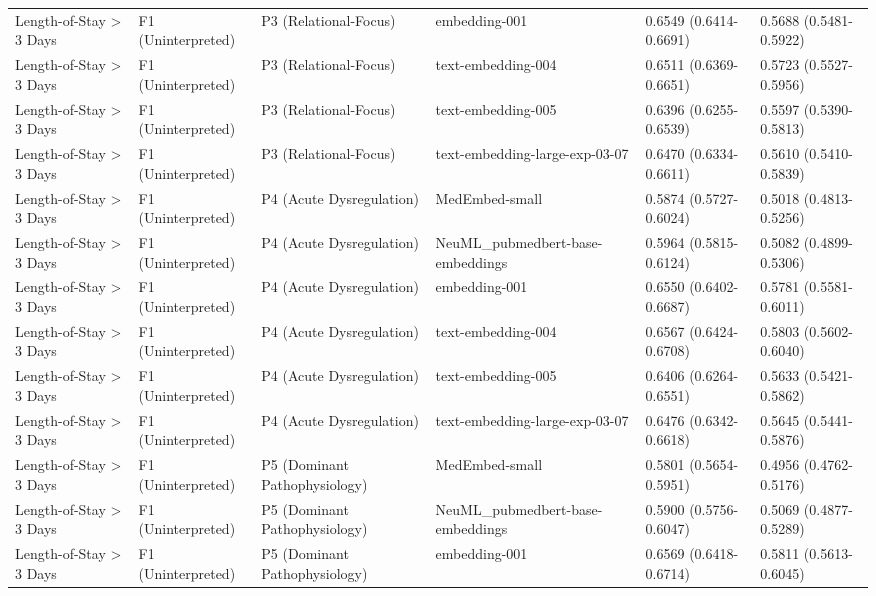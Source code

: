 \documentclass[border=0pt]{standalone}
\begin{document}
\begin{adjustbox}{width=\textwidth}
\begin{tabular}{llllll}
Length-of-Stay \textgreater{} 3 Days & F1 (Uninterpreted) & P3 (Relational-Focus) & embedding-001 & 0.6549 (0.6414-0.6691) & 0.5688 (0.5481-0.5922) \\
Length-of-Stay \textgreater{} 3 Days & F1 (Uninterpreted) & P3 (Relational-Focus) & text-embedding-004 & 0.6511 (0.6369-0.6651) & 0.5723 (0.5527-0.5956) \\
Length-of-Stay \textgreater{} 3 Days & F1 (Uninterpreted) & P3 (Relational-Focus) & text-embedding-005 & 0.6396 (0.6255-0.6539) & 0.5597 (0.5390-0.5813) \\
Length-of-Stay \textgreater{} 3 Days & F1 (Uninterpreted) & P3 (Relational-Focus) & text-embedding-large-exp-03-07 & 0.6470 (0.6334-0.6611) & 0.5610 (0.5410-0.5839) \\
Length-of-Stay \textgreater{} 3 Days & F1 (Uninterpreted) & P4 (Acute Dysregulation) & MedEmbed-small & 0.5874 (0.5727-0.6024) & 0.5018 (0.4813-0.5256) \\
Length-of-Stay \textgreater{} 3 Days & F1 (Uninterpreted) & P4 (Acute Dysregulation) & NeuML\_pubmedbert-base-embeddings & 0.5964 (0.5815-0.6124) & 0.5082 (0.4899-0.5306) \\
Length-of-Stay \textgreater{} 3 Days & F1 (Uninterpreted) & P4 (Acute Dysregulation) & embedding-001 & 0.6550 (0.6402-0.6687) & 0.5781 (0.5581-0.6011) \\
Length-of-Stay \textgreater{} 3 Days & F1 (Uninterpreted) & P4 (Acute Dysregulation) & text-embedding-004 & 0.6567 (0.6424-0.6708) & 0.5803 (0.5602-0.6040) \\
Length-of-Stay \textgreater{} 3 Days & F1 (Uninterpreted) & P4 (Acute Dysregulation) & text-embedding-005 & 0.6406 (0.6264-0.6551) & 0.5633 (0.5421-0.5862) \\
Length-of-Stay \textgreater{} 3 Days & F1 (Uninterpreted) & P4 (Acute Dysregulation) & text-embedding-large-exp-03-07 & 0.6476 (0.6342-0.6618) & 0.5645 (0.5441-0.5876) \\
Length-of-Stay \textgreater{} 3 Days & F1 (Uninterpreted) & P5 (Dominant Pathophysiology) & MedEmbed-small & 0.5801 (0.5654-0.5951) & 0.4956 (0.4762-0.5176) \\
Length-of-Stay \textgreater{} 3 Days & F1 (Uninterpreted) & P5 (Dominant Pathophysiology) & NeuML\_pubmedbert-base-embeddings & 0.5900 (0.5756-0.6047) & 0.5069 (0.4877-0.5289) \\
Length-of-Stay \textgreater{} 3 Days & F1 (Uninterpreted) & P5 (Dominant Pathophysiology) & embedding-001 & 0.6569 (0.6418-0.6714) & 0.5811 (0.5613-0.6045) \\

\end{tabular}
\end{adjustbox}
\end{document}
